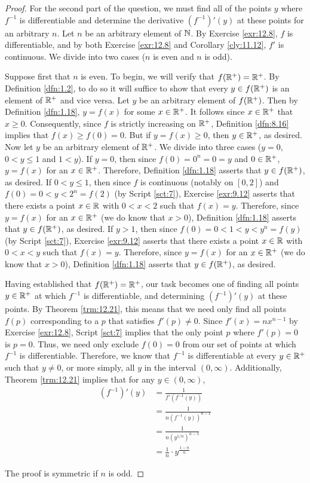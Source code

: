 \documentclass[../main.tex]{subfiles}
\begin{document}
\begin{exercise}
\begin{proof}
        For the second part of the question, we must find all of the points $y$ where $f^{-1}$ is differentiable and determine the derivative $(f^{-1})'(y)$ at these points for an arbitrary $n$. Let $n$ be an arbitrary element of $\mathbb{N}$. By Exercise \ref{exr:12.8}, $f$ is differentiable, and by both Exercise \ref{exr:12.8} and Corollary \ref{cly:11.12}, $f'$ is continuous. We divide into two cases ($n$ is even and $n$ is odd).\par\smallskip
        Suppose first that $n$ is even. To begin, we will verify that $f(\mathbb{R}^+)=\mathbb{R}^+$. By Definition \ref{dfn:1.2}, to do so it will suffice to show that every $y\in f(\mathbb{R}^+)$ is an element of $\mathbb{R}^+$ and vice versa. Let $y$ be an arbitrary element of $f(\mathbb{R}^+)$. Then by Definition \ref{dfn:1.18}, $y=f(x)$ for some $x\in\mathbb{R}^+$. It follows since $x\in\mathbb{R}^+$ that $x\geq 0$. Consequently, since $f$ is strictly increasing on $\mathbb{R}^+$, Definition \ref{dfn:8.16} implies that $f(x)\geq f(0)=0$. But if $y=f(x)\geq 0$, then $y\in\mathbb{R}^+$, as desired. Now let $y$ be an arbitrary element of $\mathbb{R}^+$. We divide into three cases ($y=0$, $0<y\leq 1$ and $1<y$). If $y=0$, then since $f(0)=0^n=0=y$ and $0\in\mathbb{R}^+$, $y=f(x)$ for an $x\in\mathbb{R}^+$. Therefore, Definition \ref{dfn:1.18} asserts that $y\in f(\mathbb{R}^+)$, as desired. If $0<y\leq 1$, then since $f$ is continuous (notably on $[0,2]$) and $f(0)=0<y<2^n=f(2)$ (by Script \ref{sct:7}), Exercise \ref{exr:9.12} asserts that there exists a point $x\in\mathbb{R}$ with $0<x<2$ such that $f(x)=y$. Therefore, since $y=f(x)$ for an $x\in\mathbb{R}^+$ (we do know that $x>0$), Definition \ref{dfn:1.18} asserts that $y\in f(\mathbb{R}^+)$, as desired. If $y>1$, then since $f(0)=0<1<y<y^n=f(y)$ (by Script \ref{sct:7}), Exercise \ref{exr:9.12} asserts that there exists a point $x\in\mathbb{R}$ with $0<x<y$ such that $f(x)=y$. Therefore, since $y=f(x)$ for an $x\in\mathbb{R}^+$ (we do know that $x>0$), Definition \ref{dfn:1.18} asserts that $y\in f(\mathbb{R}^+)$, as desired.\par
        Having established that $f(\mathbb{R}^+)=\mathbb{R}^+$, our task becomes one of finding all points $y\in\mathbb{R}^+$ at which $f^{-1}$ is differentiable, and determining $(f^{-1})'(y)$ at these points. By Theorem \ref{trm:12.21}, this means that we need only find all points $f(p)$ corresponding to a $p$ that satisfies $f'(p)\neq 0$. Since $f'(x)=nx^{n-1}$ by Exercise \ref{exr:12.8}, Script \ref{sct:7} implies that the only point $p$ where $f'(p)=0$ is $p=0$. Thus, we need only exclude $f(0)=0$ from our set of points at which $f^{-1}$ is differentiable. Therefore, we know that $f^{-1}$ is differentiable at every $y\in\mathbb{R}^+$ such that $y\neq 0$, or more simply, all $y$ in the interval $(0,\infty)$. Additionally, Theorem \ref{trm:12.21} implies that for any $y\in(0,\infty)$,
        \begin{align*}
            (f^{-1})'(y) &= \frac{1}{f'(f^{-1}(y))}\\
            &= \frac{1}{n(f^{-1}(y))^{n-1}}\\
            &= \frac{1}{n(y^{1/n})^{n-1}}\\
            &= \frac{1}{n}\cdot y^{\frac{1-n}{n}}
        \end{align*}\par\smallskip
        The proof is symmetric if $n$ is odd.
        

\end{proof}
\end{exercise}
\end{document}

